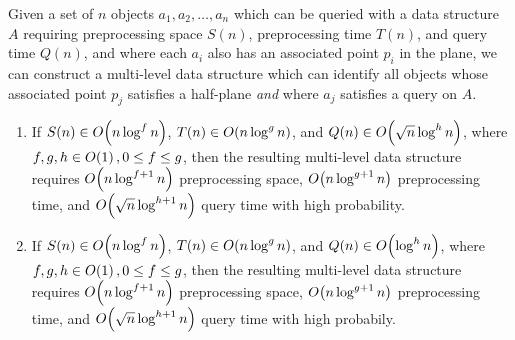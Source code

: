 \begin{corollary}
\label{cor:multichan}

Given a set of $n$ objects $a_1, a_2, \ldots, a_n$ which can be queried with a 
data structure $A$ requiring preprocessing space $S(n)$, 
preprocessing time $T(n)$, and query time $Q(n)$, and where each $a_i$ also has 
an associated point $p_i$ in the plane, we can construct a multi-level 
data structure which can identify all objects whose associated point $p_j$ 
satisfies a half-plane  \emph{and} where $a_j$ satisfies a query on $A$.

\begin{enumerate}
\item If $S(n) \in O\!\left(n \log^f{n}\right)$, $T(n) \in O\!\left(n \log^g{n}\right)$, and 
$Q(n) \in O\!\left(\sqrt{n} \log^h{n}\right)$, where $f, g, h \in O\!\left(1\right), 0 \leq f 
\leq g$, then the resulting multi-level data structure requires 
$O\!\left(n\log^{f+1}{n}\right)$ preprocessing space, $O\!\left(n\log^{g+1}{n}\right)$ 
preprocessing time, and $O\!\left(\sqrt{n}\log^{h+1}{n}\right)$ query time with high 
probability.

\item If $S(n) \in O\!\left(n \log^f{n}\right)$, $T(n) \in O\!\left(n \log^g{n}\right)$, and 
$Q(n) \in O\!\left(\log^h{n}\right)$, where $f, g, h \in O\!\left(1\right), 0 \leq f \leq g$, 
then the resulting multi-level data structure requires $O\!\left(n\log^{f+1}{n}\right)$ 
preprocessing space, $O\!\left(n\log^{g+1}{n}\right)$ preprocessing time, and 
$O\!\left(\sqrt{n}\log^{h+1}{n}\right)$ query time with high probabily.

\end{enumerate}
\end{corollary}

